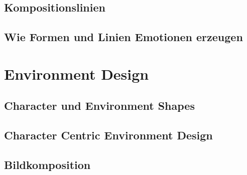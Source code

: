 \subsection{Kompositionslinien}

\subsection{Wie Formen und Linien Emotionen erzeugen}



\section{Environment Design}

\subsection{Character und Environment Shapes}

\subsection{Character Centric Environment Design }

\subsection{Bildkomposition}






